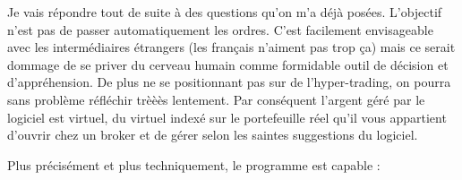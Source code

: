     Je vais répondre tout de suite à des questions qu'on m'a déjà posées.
L'objectif n'est pas de passer automatiquement les ordres. C'est facilement
envisageable avec les intermédiaires étrangers (les français n'aiment pas trop
ça) mais ce serait dommage de se priver du cerveau humain comme formidable
outil de décision et d'appréhension. De plus ne se positionnant pas sur de
l'hyper-trading, on pourra sans problème réfléchir trèèès lentement. Par
conséquent l'argent géré par le logiciel est virtuel, du virtuel indexé sur
le portefeuille réel qu'il vous appartient d'ouvrir chez un broker et de
gérer selon les saintes suggestions du logiciel.\newline
\newline


\newpage
Plus précisément et plus techniquement, le programme est capable :\newline

